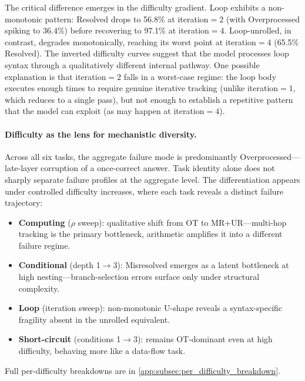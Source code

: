 The critical difference emerges in the difficulty gradient. Loop exhibits a non-monotonic pattern: Resolved drops to 56.8\% at iteration${=}2$ (with Overprocessed spiking to 36.4\%) before recovering to 97.1\% at iteration${=}4$. Loop-unrolled, in contrast, degrades monotonically, reaching its worst point at iteration${=}4$ (65.5\% Resolved). The inverted difficulty curves suggest that the model processes loop syntax through a qualitatively different internal pathway. One possible explanation is that iteration${=}2$ falls in a worst-case regime: the loop body executes enough times to require genuine iterative tracking (unlike iteration${=}1$, which reduces to a single pass), but not enough to establish a repetitive pattern that the model can exploit (as may happen at iteration${=}4$).


\paragraph{Difficulty as the lens for mechanistic diversity.}
Across all six tasks, the aggregate failure mode is predominantly Overprocessed---late-layer corruption of a once-correct answer. Task identity alone does not sharply separate failure profiles at the aggregate level. The differentiation appears under controlled difficulty increases, where each task reveals a distinct failure trajectory:
\begin{itemize}[nosep]
\item \textbf{Computing} ($\rho$ sweep): qualitative shift from OT to MR+UR---multi-hop tracking is the primary bottleneck, arithmetic amplifies it into a different failure regime.
\item \textbf{Conditional} (depth 1$\to$3): Misresolved emerges as a latent bottleneck at high nesting---branch-selection errors surface only under structural complexity.
\item \textbf{Loop} (iteration sweep): non-monotonic U-shape reveals a syntax-specific fragility absent in the unrolled equivalent.
\item \textbf{Short-circuit} (conditions 1$\to$3): remains OT-dominant even at high difficulty, behaving more like a data-flow task.
\end{itemize}
Full per-difficulty breakdowns are in \cref{app:subsec:per_difficulty_breakdown}.


